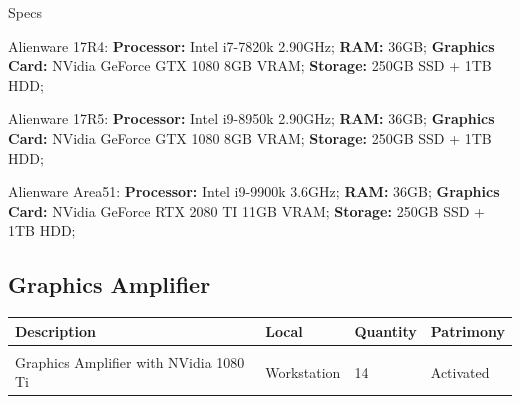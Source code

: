{\Large Specs}
\vspace{1em}

Alienware 17R4: \textbf{Processor:} Intel i7-7820k 2.90GHz; \textbf{RAM:} 36GB; \textbf{Graphics Card:} NVidia GeForce GTX 1080 8GB VRAM; \textbf{Storage:} 250GB SSD + 1TB HDD;

Alienware 17R5: \textbf{Processor:} Intel i9-8950k 2.90GHz; \textbf{RAM:} 36GB; \textbf{Graphics Card:} NVidia GeForce GTX 1080 8GB VRAM; \textbf{Storage:} 250GB SSD + 1TB HDD;

Alienware Area51: \textbf{Processor:} Intel i9-9900k 3.6GHz; \textbf{RAM:} 36GB; \textbf{Graphics Card:} NVidia GeForce RTX 2080 TI 11GB VRAM; \textbf{Storage:} 250GB SSD + 1TB HDD;
\newpage

\subsection{Graphics Amplifier}
\begin{tabularx}{\textwidth}{ Y  Y  Y  Y }
    \textbf{Description} &  \textbf{Local} &  \textbf{Quantity} & \textbf{Patrimony}\\
    \hline \\
     Graphics Amplifier with NVidia 1080 Ti & Workstation & 14 & Activated
\end{tabularx}
\vspace{1cm}

